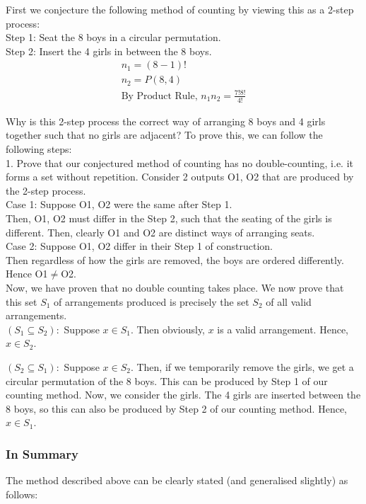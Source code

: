 \documentclass{article}
\begin{document}
First we conjecture the following method of counting by viewing this as a 2-step process:\\
Step 1: Seat the 8 boys in a circular permutation.\\
Step 2: Insert the 4 girls in between the 8 boys.
\begin{align*}
    n_1=(8-1)!\\
    n_2=P(8,4)\\
    \text{By Product Rule, } n_1n_2=\frac{7!8!}{4!}
\end{align*}

Why is this 2-step process the correct way of arranging 8 boys and 4 girls together such that no girls are adjacent?
To prove this, we can follow the following steps:\\
1. Prove that our conjectured method of counting has no double-counting, i.e. it forms a set without repetition.
Consider 2 outputs O1, O2 that are produced by the 2-step process.\\
Case 1: Suppose O1, O2 were the same after Step 1.\\
Then, O1, O2 must differ in the Step 2, such that the seating of the girls is different. Then, clearly O1 and O2 are distinct ways of arranging seats.\\
Case 2: Suppose O1, O2 differ in their Step 1 of construction.\\
Then regardless of how the girls are removed, the boys are ordered differently. Hence O1$\neq$O2.\\
Now, we have proven that no double counting takes place. We now prove that this set $S_1$ of arrangements produced is precisely the set $S_2$ of all valid arrangements.\\
$(S_1\subseteq S_2):$
Suppose $x\in S_1$. Then obviously, $x$ is a valid arrangement. Hence, $x\in S_2$.

$(S_2\subseteq S_1):$
Suppose $x\in S_2$. Then, if we temporarily remove the girls, we get a circular permutation of the 8 boys. This can be produced by Step 1 of our counting method. Now, we consider the girls. The 4 girls are inserted between the 8 boys, so this can also be produced by Step 2 of our counting method. Hence, $x\in S_1$.

\subsubsection{In Summary}
The method described above can be clearly stated (and generalised slightly) as follows:
\end{document}
